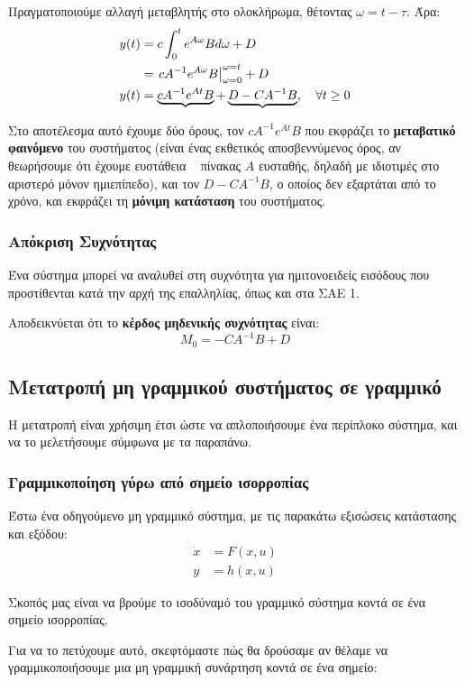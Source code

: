 \documentclass[11pt,a4paper,notitlepage,fleqn]{article}
\let\mytodo\todo
\renewcommand{\todo}[1]{\par\mytodo[inline,noline]{#1}}
\begin{document}
Πραγματοποιούμε αλλαγή μεταβλητής στο ολοκλήρωμα, θέτοντας \( \omega = t-τ \). Άρα:
\begin{align*}
	y(t) &= c\int_{0}^{t}e^{A\omega }Bd \omega +D \\
	&= \left. cA^{-1}e^{A\omega }B\right|_{\omega = 0}^{\omega = t}
	+ D
	\\ y(t) &=
	\underbrace{cA^{-1}e^{At} B} +\underbrace{D-CA^{-1}B},\quad \forall t \geq 0
\end{align*}

Στο αποτέλεσμα αυτό έχουμε δύο όρους, τον \( cA^{-1}e^{At}B \) που
εκφράζει το \textbf{μεταβατικό φαινόμενο} του συστήματος
(είναι ένας εκθετικός αποσβεννύμενος όρος, αν θεωρήσουμε ότι έχουμε ευστάθεια \textemdash~ πίνακας \( A \) ευσταθής, δηλαδή με ιδιοτιμές
στο αριστερό μόνον ημιεπίπεδο), και τον
\( D-CA^{-1}B \), ο οποίος δεν εξαρτάται από το χρόνο, και εκφράζει
τη \textbf{μόνιμη κατάσταση} του συστήματος.

\subsubsection{Απόκριση Συχνότητας}
Ένα σύστημα μπορεί να αναλυθεί στη συχνότητα για ημιτονοειδείς εισόδους
που προστίθενται κατά την αρχή της επαλληλίας, όπως και στα ΣΑΕ 1.

Αποδεικνύεται ότι το \textbf{κέρδος μηδενικής συχνότητας} είναι:
\[
M_0 = -CA^{-1}B + D
\]

\subsection{Μετατροπή μη γραμμικού συστήματος σε γραμμικό}
Η μετατροπή είναι χρήσιμη έτσι ώστε να απλοποιήσουμε ένα περίπλοκο
σύστημα, και να το μελετήσουμε σύμφωνα με τα παραπάνω.

\subsubsection{Γραμμικοποίηση γύρω από σημείο ισορροπίας}
\label{sec:linear_linearization_point}
Έστω ένα οδηγούμενο μη γραμμικό σύστημα, με τις παρακάτω εξισώσεις
κατάστασης και εξόδου:
\begin{align*}
	\dot x &= F(x,u)\\
	y &= h(x,u)
\end{align*}

Σκοπός μας είναι να βρούμε το ισοδύναμό του γραμμικό σύστημα κοντά σε
ένα σημείο ισορροπίας.

Για να το πετύχουμε αυτό, σκεφτόμαστε πώς θα δρούσαμε αν θέλαμε να
γραμμικοποιήσουμε μια μη γραμμική συνάρτηση κοντά σε ένα σημείο:
\todo{Graph 23}
\end{document}
